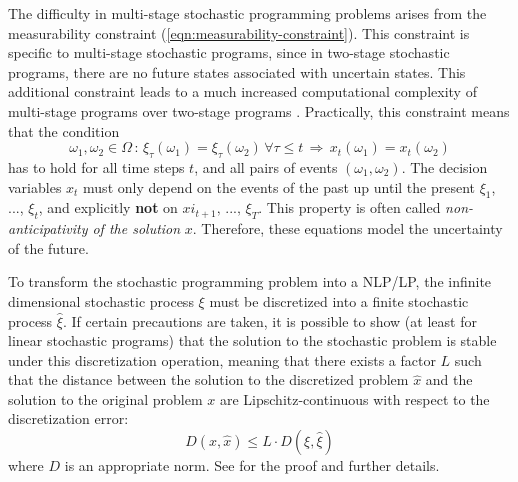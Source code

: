 \documentclass[a4paper, 12pt] {article}
\begin{document}
The difficulty in multi-stage stochastic programming problems arises from the measurability constraint (\ref{eqn:measurability-constraint}). This constraint is specific to multi-stage stochastic programs, since in two-stage stochastic programs, there are no future states associated with uncertain states. This additional constraint leads to a much increased computational complexity of multi-stage programs over two-stage programs \cite{Shapiro2005,Shapiro2008}. Practically, this constraint means that the condition
\begin{equation}
  \label{eq:mathematical_NAC}
  \omega_1,\omega_2\in \Omega \, : \, \xi_\tau(\omega_1) = \xi_\tau(\omega_2)\,\forall \tau\leq t\,\Rightarrow \, x_t(\omega_1) = x_t(\omega_2) 
\end{equation}
has to hold for all time steps $t$, and all pairs of events $(\omega_1,\omega_2)$. The decision variables $x_t$ must only depend on the events of the past up until the present $\xi_1$, ..., $\xi_t$, and explicitly \textbf{not} on $xi_{t+1},\, ...,\,\xi_T$. This property is often called \textit{non-anticipativity of the solution} $x$. Therefore, these equations model the uncertainty of the future.

To transform the stochastic programming problem into a NLP/LP, the infinite dimensional stochastic process $\xi$ must be discretized into a finite stochastic process $\hat{\xi}$. If certain precautions are taken, it is possible to show (at least for linear stochastic programs) that the solution to the stochastic problem is stable under this discretization operation, meaning that there exists a factor $L$ such that the distance between the solution to the discretized problem $\hat{x}$ and the solution to the original problem $x$ are Lipschitz-continuous with respect to the discretization error:
\begin{equation}
  D(x , \hat{x}) \leq L\cdot D(\xi,\hat{\xi})
\end{equation}
where $D$ is an appropriate norm. See \cite{Heitsch2009} for the proof and further details.
\end{document}
